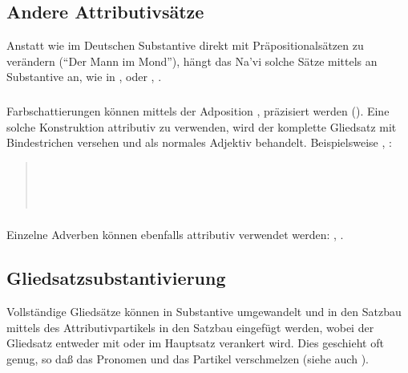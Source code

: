 \subsection{Andere Attributivs\"atze} Anstatt wie im Deutschen Substantive direkt mit
Pr\"apositionals\"atzen zu ver\"andern ("`Der Mann im Mond"'), h\"angt das Na’vi solche
S\"atze mittels  an Substantive an, wie in ,  oder
,
.

\subsubsection{} Farbschattierungen k\"onnen mittels der Adposition ,
 pr\"azisiert werden (). Eine solche
Konstruktion attributiv zu verwenden, wird der komplette Gliedsatz mit Bindestrichen
versehen und als normales Adjektiv behandelt.
Beispielsweise , :
\begin{quotation}
\indent{}\\
\indent{}\\
\indent{}\\
\indent{}
\end{quotation}
\label{syn:attr:na}

\subsubsection{} Einzelne Adverben k\"onnen ebenfalls attributiv verwendet werden:
, .


\subsection{Gliedsatzsubstantivierung} Vollst\"andige Glieds\"atze k\"onnen in
Substantive umgewandelt und in den Satzbau mittels des Attributivpartikels in den
Satzbau eingef\"ugt werden, wobei der Gliedsatz entweder mit  oder 
im Hauptsatz verankert wird. Dies geschieht oft genug, so da\ss{} das Pronomen und
das Partikel verschmelzen (siehe auch ). \label{syn:clause-nom}


